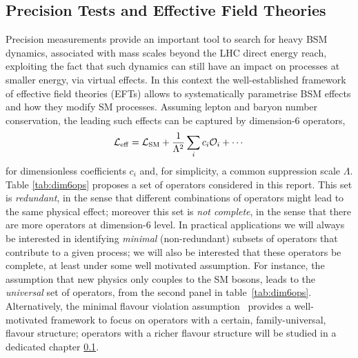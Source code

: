 \subsection{Precision Tests and Effective Field Theories}
Precision measurements provide an important tool to search for heavy BSM dynamics, associated with mass scales beyond the LHC direct energy reach,  exploiting the fact that such dynamics can still have an impact on processes at smaller energy, via virtual effects.
%
In this context the well-established framework of effective field theories (EFTs) allows to systematically parametrise BSM effects and how they modify SM processes. Assuming lepton and baryon number conservation, the leading such effects can be captured by dimension-6 operators,
\begin{equation}\label{EFTLAG}
\mathcal{L}_{\rm eff} = \mathcal{L}_{\rm SM} + \frac{1}{\Lambda^2} \sum_{i} c_i \mathcal{O}_i+\cdots
\end{equation}
for dimensionless coefficients $c_i$ and, for simplicity, a common suppression scale $\Lambda$. Table \ref{tab:dim6ops} proposes a  set of operators considered in this report. This set is \emph{redundant}, in the sense that different combinations of operators might lead to the same physical effect; moreover this set is \emph{not complete}, in the sense that there are more  operators at dimension-6 level.
In practical applications we will always be interested in identifying \emph{minimal} (non-redundant) subsets of operators that contribute to a given process; we will also be interested that these operators be complete, at least under some well motivated assumption. For instance, the assumption that new physics only couples to the SM bosons, leads to the \emph{universal} set of operators, from the second panel in table~\ref{tab:dim6ops}. Alternatively, the minimal flavour violation assumption~\cite{DAmbrosio:2002vsn} provides a well-motivated framework to focus on operators with a certain, family-universal, flavour structure; operators with a richer flavour structure will be studied in a dedicated chapter \ref{}.



